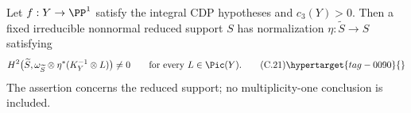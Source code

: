 \begin{proposition}\hypertarget{tag-01FO}{}\label{cdp:st:C4e}


Let $f:Y\to\PP^1$ satisfy the integral CDP hypotheses and $c_3(Y)>0$. Then a fixed irreducible nonnormal reduced support $S$ has normalization $\eta:\widetilde S\to S$ satisfying
\[
 H^2\bigl(\widetilde S,\omega_{\widetilde S}\otimes
           \eta^*(K_Y^{-1}\otimes L)\bigr)\ne0
 \qquad\hbox{for every }L\in\Pic(Y).                  \tag{C.21}\hypertarget{tag-0090}{}\label{cdp:eq:C.21}
\]
The assertion concerns the reduced support; no multiplicity-one conclusion is included.
\end{proposition}
